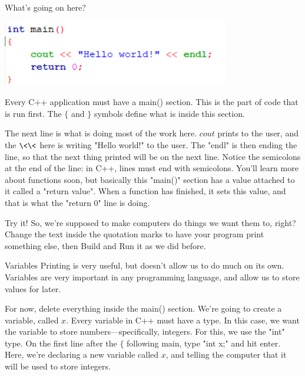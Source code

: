 \documentclass{beamer}
\begin{document}
\begin{frame}{What's going on here?}

\includegraphics[scale=1]{cpp2.png}

Every C++ application must have a \alert{main()} section. This is the part of code that is run first. The $\{$ and $\}$ symbols define what is inside this section. \newline

The next line is what is doing most of the work here. $cout$ prints to the user, and the $\<\<$ here is writing "Hello world!" to the user. The "endl" is then ending the line, so that the next thing printed will be on the next line. Notice the semicolons at the end of the line: in C++, lines must end with semicolons. You'll learn more about functions soon, but basically this "main()" section has a value attached to it called a "return value". When a function has finished, it sets this value, and that is what the "return 0" line is doing.

\end{frame}

\begin{frame}{Try it!}
    So, we're supposed to make computers do things we want them to, right? Change the text inside the quotation marks to have your program print something else, then Build and Run it as we did before.
\end{frame}

\begin{frame}{Variables}
    Printing is very useful, but doesn't allow us to do much on its own. \alert{Variables} are very important in any programming language, and allow us to store values for later. \newline
    
    For now, delete everything inside the main() section. We're going to create a variable, called $x$. Every variable in C++ must have a \alert{type}. In this case, we want the variable to store numbers---specifically, integers. For this, we use the "int" type. \newline
    On the first line after the $\{$ following main, type "int x;" and hit enter. Here, we're \alert{declaring} a new variable called $x$, and telling the computer that it will be used to store integers.  \newline

\end{frame}
\end{document}
